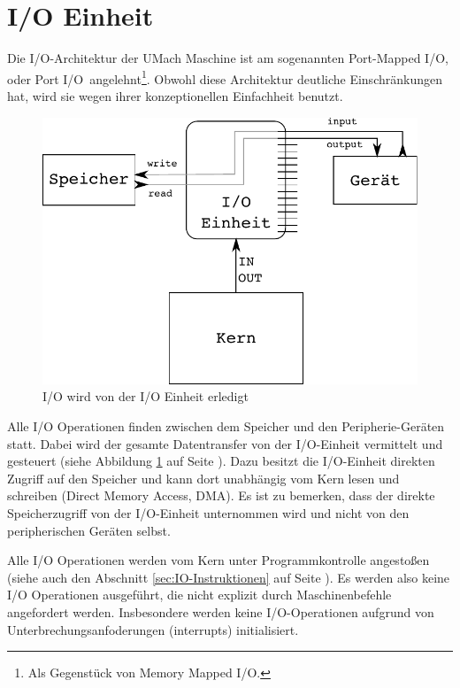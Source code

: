\section{I/O Einheit}
\label{sec:IO-Einheit}

Die I/O-Architektur der UMach Maschine ist am sogenannten \glqq Port-Mapped
I/O\grqq, oder \glqq Port I/O\grqq\ angelehnt\footnote{Als Gegenstück von \glqq
Memory Mapped I/O\grqq.}. Obwohl diese Architektur deutliche Einschränkungen
hat, wird sie wegen ihrer konzeptionellen Einfachheit benutzt.

\begin{figure}[htp]
 \centering
 \includegraphics{./img/UMach-IO-Prozess.pdf}
 \caption{I/O wird von der I/O Einheit erledigt}
 \label{fig:UMach-IO-Prozess}
\end{figure}

Alle I/O Operationen finden zwischen dem Speicher und den Peripherie-Geräten
statt. Dabei wird der gesamte Datentransfer von der I/O-Einheit vermittelt und
gesteuert (siehe Abbildung \ref{fig:UMach-IO-Prozess} auf Seite
\pageref{fig:UMach-IO-Prozess}). Dazu besitzt die I/O-Einheit direkten Zugriff
auf den Speicher und kann dort unabhängig vom Kern lesen und schreiben (Direct
Memory Access, \gls{DMA}). Es ist zu bemerken, dass der direkte
Speicherzugriff von der I/O-Einheit unternommen wird und nicht von den
peripherischen Geräten selbst.

Alle I/O Operationen werden vom Kern unter Programmkontrolle angestoßen (siehe
auch den Abschnitt \ref{sec:IO-Instruktionen} auf Seite
\pageref{sec:IO-Instruktionen}). Es werden also keine I/O Operationen
ausgeführt, die nicht explizit durch Maschinenbefehle angefordert werden.
Insbesondere werden keine I/O-Operationen aufgrund von
Unterbrechungsanfoderungen (interrupts) initialisiert.

